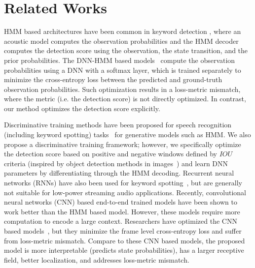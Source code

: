 \documentclass{article}
\begin{document}
 \section{Related Works}
HMM based architectures have been common in keyword detection \cite{mi_hmm_Bahl_1986, rohlichek1989,rose1990,wilpon1990automatic,alphanet_Bridle90}, where an acoustic model
computes the observation probabilities and the HMM decoder computes the detection score using the observation, the state transition, and the prior probabilities.
The DNN-HMM based models~\cite{SigtiaHRMB18,google2014,Chen2013AHH} compute the observation probabilities using a DNN with a softmax layer, which is trained separately to minimize the cross-entropy loss between the predicted and ground-truth observation probabilities.
Such optimization results in a loss-metric mismatch, where the metric (i.e. the detection score) is not directly optimized.
In contrast, our method optimizes the detection score explicitly.

Discriminative training methods have been proposed for speech recognition (including keyword spotting) tasks~\cite{dis_KWS_keshet_2009,seq_dis_KWS_keshet_2018} for generative models such as HMM.
We also propose a discriminative training framework; however, we specifically optimize the detection score based on positive and negative windows defined by $IOU$ criteria (inspired by object detection methods in images~\cite{yoloRedmon2016, yolo3Redmon2017, FasterRcnn2015}) and learn DNN parameters by differentiating through the HMM decoding.
Recurrent neural networks (RNNs) have also been used for keyword spotting~\cite{fernandez2007application,woellmer2013keyword,lengerich2016end,hwang2015online,graves2006connectionist}, but are generally not suitable for low-power streaming audio applications.
Recently, convolutional neural networks (CNN) based end-to-end trained models \cite{Zhang2017HelloEK,Tang2018DeepRL,google2015} have been shown to work better than the HMM based model.
However, these models require more computation to encode a large context.
Researchers have optimized the CNN based models~\cite{svdf2018,svdf2015,Sun2017CompressedTD,Higuchi2020}, but they minimize the frame level cross-entropy loss and suffer from loss-metric mismatch.
Compare to these CNN based models, the proposed model is more interpretable (predicts state probabilities), has a larger receptive field, better localization, and addresses loss-metric mismatch.
 
\end{document}
